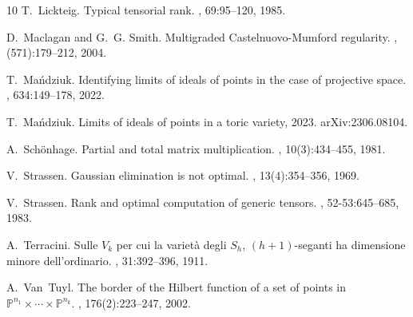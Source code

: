 \documentclass[12pt]{amsart}
\theoremstyle{definition}
\theoremstyle{remark}
\theoremstyle{definition}
\begin{document}
\begin{thebibliography}{10}
T.~Lickteig.
\newblock Typical tensorial rank.
, 69:95--120, 1985.

D.~Maclagan and G.~G. Smith.
\newblock Multigraded {C}astelnuovo-{M}umford regularity.
, (571):179--212, 2004.

T.~Mańdziuk.
\newblock Identifying limits of ideals of points in the case of projective
  space.
, 634:149--178, 2022.

T.~Mańdziuk.
\newblock Limits of ideals of points in a toric variety, 2023.
\newblock arXiv:2306.08104.

A.~Sch{\"o}nhage.
\newblock Partial and total matrix multiplication.
, 10(3):434--455, 1981.

V.~Strassen.
\newblock Gaussian elimination is not optimal.
, 13(4):354--356, 1969.

V.~Strassen.
\newblock Rank and optimal computation of generic tensors.
, 52-53:645--685, 1983.

A.~Terracini.
\newblock Sulle {$V_k$} per cui la variet{\`a} degli {$S_h$}, $(h+1)$-seganti
  ha dimensione minore dell'ordinario.
, 31:392–396, 1911.

A.~Van~Tuyl.
\newblock The border of the {H}ilbert function of a set of points in
  {$\mathbb{P}^{n_1}\times \cdots \times \mathbb{P}^{n_k}$}.
, 176(2):223--247, 2002.

\end{thebibliography}
\end{document}
